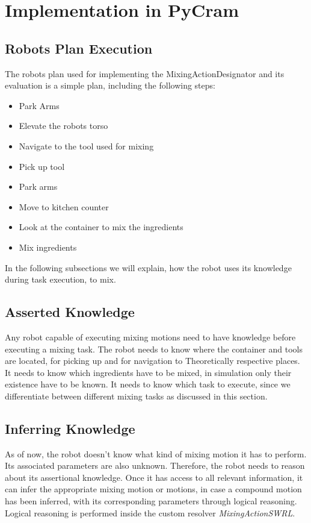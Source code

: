 \section{Implementation in PyCram}

\subsection{Robots Plan Execution}
The robots plan used for implementing the MixingActionDesignator and its evaluation is 
a simple plan, including the following steps:

\begin{itemize}
    \item Park Arms
    \item Elevate the robots torso
    \item Navigate to the tool used for mixing
    \item Pick up tool
    \item Park arms
    \item Move to kitchen counter
    \item Look at the container to mix the ingredients
    \item Mix ingredients
\end{itemize}

In the following subsections we will explain, how the robot uses its knowledge during task execution, 
to mix. 

\subsection{Asserted Knowledge}
Any robot capable of executing mixing motions need to have knowledge before executing a mixing task. 
The robot needs to know where the container and tools are located, for picking up and for navigation to Theoretically
respective places. It needs to know which ingredients have to be mixed, in simulation only their existence have to be known. 
It needs to know which task to execute, since we differentiate between different mixing tasks as discussed in this section. 


\subsection{Inferring Knowledge}
As of now, the robot doesn't know what kind of mixing motion it has to perform. Its associated parameters are also unknown. 
Therefore, the robot needs to reason about its assertional knowledge.
Once it has access to all relevant information, it can infer the appropriate mixing motion or motions, in case a compound motion has been
inferred, with its corresponding parameters through logical reasoning.
Logical reasoning is performed inside the custom resolver \textit{MixingActionSWRL}.

